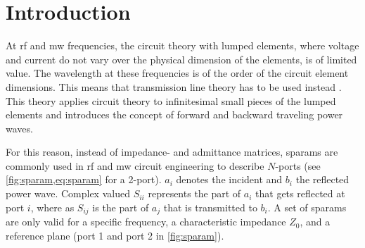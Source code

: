 \documentclass[12pt,a4paper,parskip=full,abstract=true,BCOR=10mm,twoside,open=right]{scrreprt}
\begin{document}
\renewcommand{\abstractname}{Acknowledgements}
\begin{abstract}
    \lipsum[1]
\end{abstract}

\tableofcontents

\chapter{Introduction}

At \gls{rf} and \gls{mw} frequencies, the circuit theory with lumped elements, where
voltage and current do not vary over the physical dimension of the elements, is of limited
value. The wavelength at these frequencies is of the order of the circuit
element dimensions. This means that transmission line theory has to be used instead \cite{pozar_mw_engineering_2011}.
This theory applies circuit theory to infinitesimal small pieces of the lumped elements
and introduces the concept of forward and backward traveling power waves.

For this reason, instead of impedance- and admittance matrices, \glspl{sparam}
are commonly used in \gls{rf} and \gls{mw} circuit engineering to describe
$N$-ports (see \cref{fig:sparam,eq:sparam} for a 2-port). $a_i$ denotes the incident and
$b_i$ the reflected power wave. Complex valued $S_{ii}$ represents the
part of $a_i$ that gets reflected at port $i$, where as $S_{ij}$ is the part of $a_j$ that
is transmitted to $b_i$. A set of \glspl{sparam} are only valid for a specific frequency, a
characteristic impedance $Z_0$, and a reference plane (port 1 and port 2 in \cref{fig:sparam}).
\end{document}
